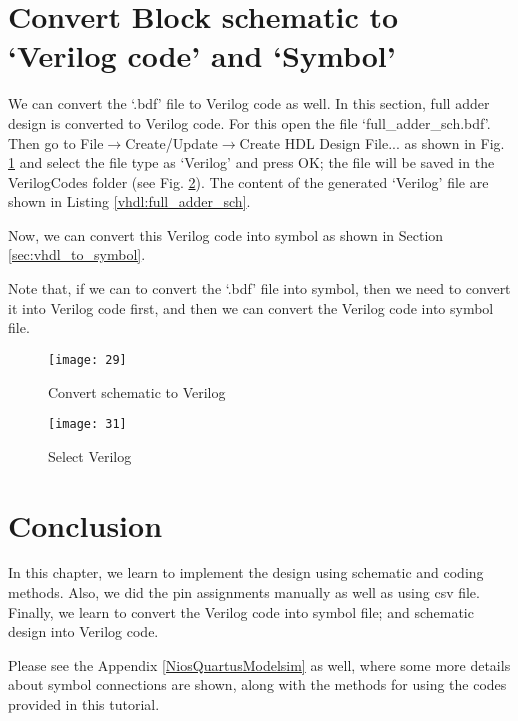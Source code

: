 \section{Convert Block schematic to `Verilog code' and `Symbol'}

We can convert the `.bdf' file to Verilog code as well. In this section, full adder design is converted to Verilog code. For this open the file `full\_adder\_sch.bdf'. Then go to File$\rightarrow$Create/Update$\rightarrow$Create HDL Design File... as shown in Fig. \ref{fig:bdf_to_vhdl} and select the file type as `Verilog' and press OK; the file will be saved in the VerilogCodes folder (see Fig. \ref{fig:to_vhdl}). The content of the generated `Verilog' file are shown in Listing \ref{vhdl:full_adder_sch}. 

Now, we can convert this Verilog code into symbol as shown in Section \ref{sec:vhdl_to_symbol}. 

\begin{noNumBox}
	Note that, if we can to convert the `.bdf' file into symbol, then we need to convert it into Verilog code first, and then we can convert the Verilog code into symbol file. 
\end{noNumBox}

\begin{figure}[!h]
	\centering
	\texttt{[image: 29]}
	\caption{Convert schematic to Verilog}
	\label{fig:bdf_to_vhdl}
\end{figure}


\begin{figure}[!h]
	\centering
	\texttt{[image: 31]}
	\caption{Select Verilog}
	\label{fig:to_vhdl}
\end{figure}



\section{Conclusion}
In this chapter, we learn to implement the design using schematic and coding methods. Also, we did the pin assignments manually as well as using csv file. Finally, we learn to convert the Verilog code into symbol file; and schematic design into Verilog code. 

\begin{noNumBox}
	Please see the Appendix \ref{NiosQuartusModelsim}  as well, where some more details about symbol connections are shown, along with the methods for using the codes provided in this tutorial. 
\end{noNumBox}

